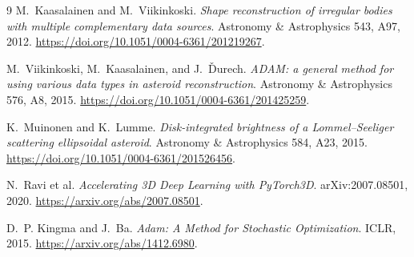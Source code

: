 \documentclass[10pt,a4paper]{article}
\begin{document}
\begingroup
\small
\setlength{\parskip}{0pt}
\begin{thebibliography}{9}
\setlength{\itemsep}{1pt}
M.~Kaasalainen and M.~Viikinkoski.
\emph{Shape reconstruction of irregular bodies with multiple complementary data sources}.
Astronomy \& Astrophysics 543, A97, 2012.
\url{https://doi.org/10.1051/0004-6361/201219267}.

M.~Viikinkoski, M.~Kaasalainen, and J.~\v{D}urech.
\emph{ADAM: a general method for using various data types in asteroid reconstruction}.
Astronomy \& Astrophysics 576, A8, 2015.
\url{https://doi.org/10.1051/0004-6361/201425259}.

K.~Muinonen and K.~Lumme.
\emph{Disk-integrated brightness of a Lommel--Seeliger scattering ellipsoidal asteroid}.
Astronomy \& Astrophysics 584, A23, 2015.
\url{https://doi.org/10.1051/0004-6361/201526456}.

N.~Ravi et al.
\emph{Accelerating 3D Deep Learning with PyTorch3D}.
arXiv:2007.08501, 2020. \url{https://arxiv.org/abs/2007.08501}.

D.~P. Kingma and J.~Ba.
\emph{Adam: A Method for Stochastic Optimization}.
ICLR, 2015. \url{https://arxiv.org/abs/1412.6980}.
\end{thebibliography}
\endgroup
\end{document}
